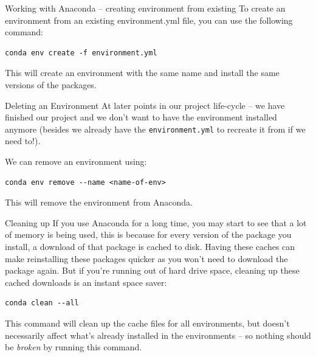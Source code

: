 \documentclass[10pt]{beamer}
\begin{document}
\begin{frame}[label={sec:org2eba9e6},fragile]{Working with Anaconda -- creating environment from existing}
 To create an environment from an existing environment.yml file, you can use the
following command:

\begin{verbatim}
conda env create -f environment.yml
\end{verbatim}

This will create an environment with the same name and install the same versions of
the packages.
\end{frame}

\begin{frame}[label={sec:org83b97e3},fragile]{Deleting an Environment}
 At later points in our project life-cycle -- we have finished our project and we
don't want to have the environment installed anymore (besides we already have the
\texttt{environment.yml} to recreate it from if we need to!).

We can remove an environment using:

\begin{verbatim}
conda env remove --name <name-of-env>
\end{verbatim}

This will remove the environment from Anaconda.
\end{frame}

\begin{frame}[label={sec:orge59cfee},fragile]{Cleaning up}
 If you use Anaconda for a long time, you may start to see that a lot of memory is
being used, this is because for every version of the package you install, a download
of that package is cached to disk. Having these caches can make reinstalling these
packages quicker as you won't need to download the package again. But if you're
running out of hard drive space, cleaning up these cached downloads is an instant
space saver:

\begin{verbatim}
conda clean --all
\end{verbatim}

This command will clean up the cache files for all environments, but doesn't
necessarily affect what's already installed in the environments -- so nothing should
be \emph{broken} by running this command.
\end{frame}
\end{document}
